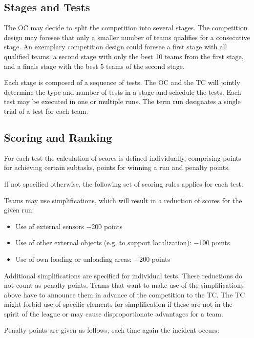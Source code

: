 \subsection{Stages and Tests}
The OC may decide to split the competition into several stages. The competition design may foresee that only a smaller number of teams qualifies for a consecutive stage. An exemplary competition design could foresee a first stage with all qualified teams, a second stage with only the best 10 teams from the first stage, and a finals stage with the best 5 teams of the second stage. 
\par
Each stage is composed of a sequence of tests. The OC and the TC will jointly determine the type and number of tests in a stage and schedule the tests. 
Each test may be executed in one or multiple runs. The term run designates a single trial of a test for each team. 

\subsection{Scoring and Ranking}
For each test the calculation of scores is defined individually, comprising points for achieving certain subtasks, points for winning a run and penalty points. 
\par
If not specified otherwise, the following set of scoring rules applies for each test:
\par
Teams may use simplifications, which will result in a reduction of scores for the given run:

\begin{itemize}
	\item Use of external sensors                        −200 points
	\item Use of other external objects (e.g. to support localization):         −100 points
	\item Use of own loading or unloading areas:                 −200 points
\end{itemize}

Additional simplifications are specified for individual tests. These reductions do not count as penalty points. Teams that want to make use of the simplifications above have to announce them in advance of the competition to the TC. The TC might forbid use of specific elements for simplification if these are not in the spirit of the league or may cause disproportionate advantages for a team. 
\par
Penalty points are given as follows, each time again the incident occurs:

